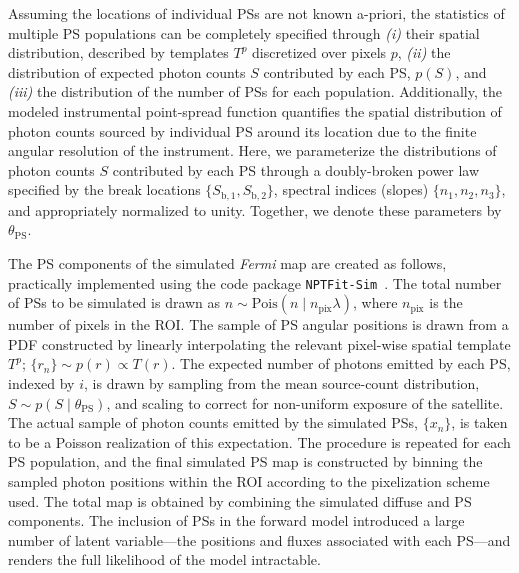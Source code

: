 \documentclass[]{article}
\newcommand{\Fermi}{\emph{Fermi}\xspace}
\begin{document}
Assuming the locations of individual PSs are not known a-priori, the statistics of multiple PS populations can be completely specified through \emph{(i)} their spatial distribution, described by templates $T^p$ discretized over pixels $p$, \emph{(ii)} the distribution of expected photon counts $S$ contributed by each PS, $p(S)$, and \emph{(iii)} the distribution of the number of PSs for each population.  Additionally, the modeled instrumental point-spread function quantifies the spatial distribution of photon counts sourced by individual PS around its location due to the finite angular resolution of the instrument.
Here, we parameterize the distributions of photon counts $S$ contributed by each PS through a doubly-broken power law
specified by the break locations $\{S_{\mathrm b, 1}, S_{\mathrm b, 2}\}$, spectral indices (slopes) $\{n_1, n_2, n_3\}$, and appropriately normalized to unity. Together, we denote these parameters by $\theta_\mathrm{PS}$.

The PS components of the simulated \Fermi map are created as follows, practically implemented using the code package \texttt{NPTFit-Sim}~\cite{NPTFit-Sim}. The total number of PSs to be simulated is drawn as $n \sim \mathrm{Pois}(n\mid n_\mathrm{pix}\lambda)$, where $n_\mathrm{pix}$ is the number of pixels in the ROI. The sample of PS angular positions is drawn from a PDF constructed by linearly interpolating the relevant pixel-wise spatial template $T^p$; $\{r_n\} \sim p(r) \propto T(r)$. The expected number of photons emitted by each PS, indexed by $i$, is drawn by sampling from the mean source-count distribution, $S \sim p\left({S}\mid\theta_\mathrm{PS}\right)$, and scaling to correct for non-uniform exposure of the satellite. The actual sample of photon counts emitted by the simulated PSs, $\{x_n\}$, is taken to be a Poisson realization of this expectation. 
The procedure is repeated for each PS population, and the final simulated PS map is constructed by binning the sampled photon positions within the ROI according to the pixelization scheme used. The total map is obtained by combining the simulated diffuse and PS components. The inclusion of PSs in the forward model introduced a large number of latent variable---the positions and fluxes associated with each PS---and renders the full likelihood of the model intractable.
\end{document}
